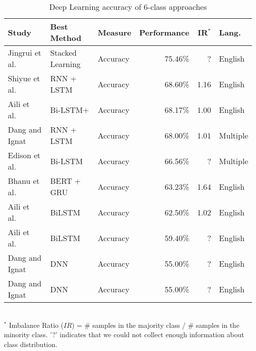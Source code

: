 \begin{table}[ht]
    \caption{Deep Learning accuracy of 6-class approaches }
    \label{tab:DL_performance_6class}
    \centering
    \begin{tabular}{m{} l l r r l}
        \toprule
        \textbf{Study} & \textbf{Best Method} & \textbf{Measure} & \textbf{Performance} & \textbf{IR$^*$} & \textbf{Lang.} \\ 
        \midrule
        Jingrui et al.~\cite{Hou2021_lr122} & Stacked Learning & Accuracy & 75.46\% & ? & English \\
        Shiyue et al.~\cite{Zhang2018_lr41} & RNN + LSTM & Accuracy & 68.60\% & 1.16 & English \\
        Aili et al.~\cite{Shen2017_lr31} & Bi-LSTM+ & Accuracy & 68.17\% & 1.00 & English \\
        Dang and Ignat~\cite{Dang2017_lr23} & RNN + LSTM & Accuracy & 68.00\% & 1.01 & Multiple \\
        Edison et al.~\cite{Marrese-Taylor2019_lr85} & Bi-LSTM & Accuracy & 66.56\% & ? & Multiple \\
        Bhanu et al.~\cite{Guda2020_lr38} & BERT + GRU & Accuracy & 63.23\% & 1.64 & English \\
        Aili et al.~\cite{Shen2020_lr2009} & BiLSTM & Accuracy & 62.50\% & 1.02 & English \\
        Aili et al.~\cite{Shen2019_lr1061} & BiLSTM & Accuracy & 59.40\% & ? & English \\
        Dang and Ignat~\cite{Dang2016_lr24} & DNN & Accuracy & 55.00\% & ? & English \\
        Dang and Ignat~\cite{Dang2016_lr89} & DNN & Accuracy & 55.00\% & ? & English \\
        \bottomrule
    \end{tabular}
    \\ \vspace{0.1cm}
    \footnotesize
    $^*$ Imbalance Ratio ($IR$) = \# samples in the majority class / \# samples in the minority class. '?' indicates that we could not collect enough information about class distribution.
\end{table}